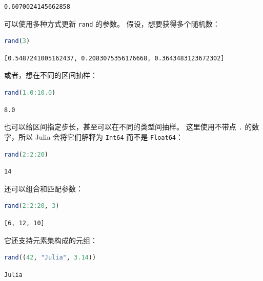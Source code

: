 \documentclass[
  notoc %
]{tufte-book}
\newcommand{\passthrough}[1]{#1}
\begin{document}
\begin{lstlisting}[language=Output]
0.6070024145662858
\end{lstlisting}

可以使用多种方式更新 \passthrough{\lstinline!rand!} 的参数。
假设，想要获得多个随机数：

\begin{lstlisting}[language=Julia]
rand(3)
\end{lstlisting}

\begin{lstlisting}[language=Output]
[0.5487241005162437, 0.2083075356176668, 0.3643483123672302]
\end{lstlisting}

或者，想在不同的区间抽样：

\begin{lstlisting}[language=Julia]
rand(1.0:10.0)
\end{lstlisting}

\begin{lstlisting}[language=Output]
8.0
\end{lstlisting}

也可以给区间指定步长，甚至可以在不同的类型间抽样。 这里使用不带点
\passthrough{\lstinline!.!} 的数字，所以 Julia 会将它们解释为
\passthrough{\lstinline!Int64!} 而不是
\passthrough{\lstinline!Float64!}：

\begin{lstlisting}[language=Julia]
rand(2:2:20)
\end{lstlisting}

\begin{lstlisting}[language=Output]
14
\end{lstlisting}

还可以组合和匹配参数：

\begin{lstlisting}[language=Julia]
rand(2:2:20, 3)
\end{lstlisting}

\begin{lstlisting}[language=Output]
[6, 12, 10]
\end{lstlisting}

它还支持元素集构成的元组：

\begin{lstlisting}[language=Julia]
rand((42, "Julia", 3.14))
\end{lstlisting}

\begin{lstlisting}[language=Output]
Julia
\end{lstlisting}
\end{document}
